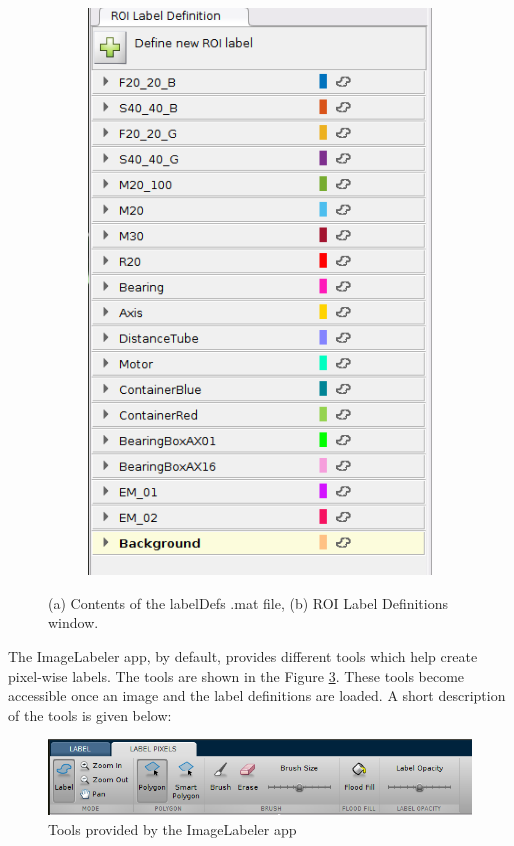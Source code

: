 \begin{figure}[h]
\begin{subfigure}{.5\textwidth}
			\includegraphics[width=0.83\linewidth]{images/roi_label_defintions}
			\caption{}
			\label{Fig:ROI}
		\end{subfigure}
		\caption{(a) Contents of the labelDefs .mat file, (b) ROI Label Definitions window.}
		\label{Fig:def_ROI}
	\end{figure}
	
The ImageLabeler app, by default, provides different tools which help create pixel-wise labels. The tools are shown in the Figure \ref{Fig:IL_tools}. These tools become accessible once an image and the label definitions are loaded. A short description of the tools is given below:
	\begin{figure}
		\centering
		\includegraphics[scale=0.55]{images/label_tools}
		\caption{Tools provided by the ImageLabeler app}
		\label{Fig:IL_tools}
	\end{figure}
	
